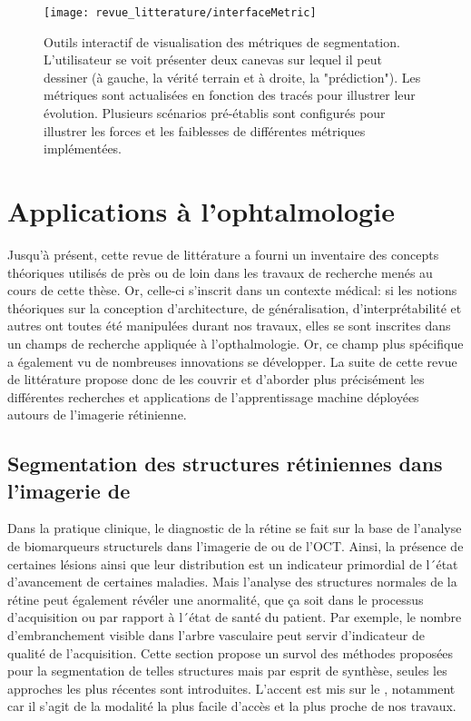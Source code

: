 \begin{figure}[h]
	\centering
	\texttt{[image: revue\_litterature/interfaceMetric]}
	\caption{Outils interactif de visualisation des métriques de segmentation. L'utilisateur se voit présenter deux canevas sur lequel il peut dessiner (à gauche, la vérité terrain et à droite, la "prédiction"). Les métriques sont actualisées en fonction des tracés pour illustrer leur évolution. Plusieurs scénarios pré-établis sont configurés pour illustrer les forces et les faiblesses de différentes métriques implémentées.}
	\label{fig:ScreenshotMetricTool}
\end{figure}


\newpage
\section{Applications à l'ophtalmologie}
\label{sec:RevueLittOphtal}

Jusqu'à présent, cette revue de littérature a fourni un inventaire des concepts théoriques utilisés de près ou de loin dans les travaux de recherche menés au cours de cette thèse. Or, celle-ci s'inscrit dans un contexte médical: si les notions théoriques sur la conception d'architecture, de généralisation, d'interprétabilité et autres ont toutes été manipulées durant nos travaux, elles se sont inscrites dans un champs de recherche appliquée à l'opthalmologie. Or, ce champ plus spécifique a également vu de nombreuses innovations se développer. La suite de cette revue de littérature propose donc de les couvrir et d'aborder plus précisément les différentes recherches et applications de l'apprentissage machine déployées autours de l'imagerie rétinienne. 
\subsection{Segmentation des structures rétiniennes dans l'imagerie de \fundus{}}
\label{sec:segmentationFCCN}
Dans la pratique clinique, le diagnostic de la rétine se fait sur la base de l'analyse de biomarqueurs structurels dans l'imagerie de \fundus{} ou de l'\ac{OCT}. Ainsi, la présence de certaines lésions ainsi que leur distribution est un indicateur primordial de l´état d'avancement de certaines maladies. Mais l'analyse des structures normales de la rétine peut également révéler une anormalité, que ça soit dans le processus d'acquisition ou par rapport à l´état de santé du patient. Par exemple, le nombre d'embranchement visible dans l'arbre vasculaire peut servir d'indicateur de qualité de l'acquisition. Cette section propose un survol des méthodes proposées pour la segmentation de telles structures mais par esprit de synthèse, seules les approches les plus récentes sont introduites. L'accent est mis sur le \fundus, notamment car il s'agit de la modalité la plus facile d'accès et la plus proche de nos travaux.

